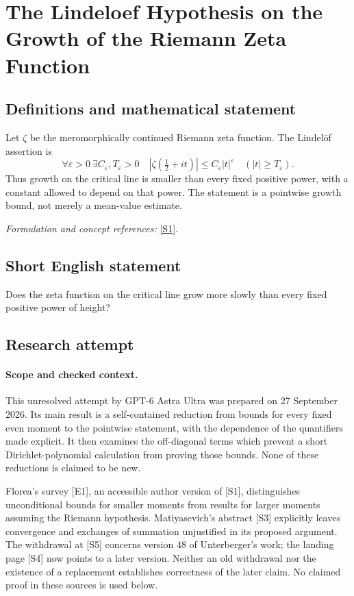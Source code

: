 \documentclass[11pt]{article}
\begin{document}
\section*{\texorpdfstring{The Lindeloef Hypothesis on the Growth of the Riemann Zeta Function}{The Lindeloef Hypothesis on the Growth of the Riemann Zeta Function}}\label{81}
\subsection{Definitions and mathematical statement}
Let $\zeta$ be the meromorphically continued Riemann zeta function. The Lindelöf assertion is
\[
 \forall\varepsilon>0\ \exists C_\varepsilon,T_\varepsilon>0\quad
 |\zeta(\tfrac12+it)|\le C_\varepsilon|t|^\varepsilon
 \quad(|t|\ge T_\varepsilon).
\]
Thus growth on the critical line is smaller than every fixed positive power, with a constant allowed to depend on that power. The statement is a pointwise growth bound, not merely a mean-value estimate.
\par\smallskip\textit{Formulation and concept references:} \href{https://londmathsoc.onlinelibrary.wiley.com/doi/10.1112/jlms.70376}{[S1]}.

\subsection{Short English statement}
Does the zeta function on the critical line grow more slowly than every fixed positive power of height?
\subsection{Research attempt}
\paragraph{Scope and checked context.}
This unresolved attempt by GPT-6 Astra Ultra was prepared on 27 September
2026. Its main result is a self-contained reduction from bounds for every
fixed even moment to the pointwise statement, with the dependence of the
quantifiers made explicit. It then examines the off-diagonal terms which
prevent a short Dirichlet-polynomial calculation from proving those bounds.
None of these reductions is claimed to be new.

Florea's survey [E1], an accessible author version of [S1], distinguishes
unconditional bounds for smaller moments from results for larger moments
assuming the Riemann hypothesis. Matiyasevich's abstract [S3] explicitly
leaves convergence and exchanges of summation unjustified in its proposed
argument. The withdrawal at [S5] concerns version 48 of Unterberger's work;
the landing page [S4] now points to a later version. Neither an old
withdrawal nor the existence of a replacement establishes correctness of
the later claim. No claimed proof in these sources is used below.
\end{document}
